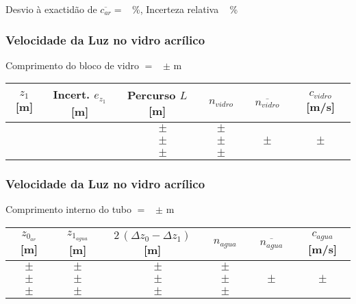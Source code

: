 \documentclass[a4paper,12pt]{article}  %
\begin{document}
\noindent Desvio à exactidão de $\overline{c_{ar}} =$~\underline{\makebox[1cm][r]{~}} \%, 
 Incerteza relativa  ~\underline{\makebox[1cm][r]{~}} \%


\subsubsection{\sf Velocidade da Luz no vidro acrílico}\label{sec:dados_ar}

\noindent Comprimento do bloco de vidro $=$~\underline{\makebox[1cm][r]{~}} $\pm$ \underline{\makebox[1cm][r]{~}} m  

\begin{center}
	\begin{tabular}{|c|c|c|c|c|c|}
	\hline
	 $z_{1}$  [m]   &  Incert. $e_{z_{1}}$  [m] & Percurso $L$ [m] & $n_{vidro}$  & $\overline{n_{vidro}}$ & $c_{vidro}$ [m/s]\\
	\hline \hline
	  &  & $ \quad \pm $ & $ \quad \pm \quad $ &  & \\ \cline{1-4}
	  &  & $ \quad \pm $ & $ \quad \pm \quad$ & $ \quad \pm \quad$  & $ \quad \pm \quad$ \\ \cline{1-4}
	  &  & $ \quad \pm $ & $ \quad \pm \quad $ &  & \\ \hline
			\end{tabular}
\end{center}

\subsubsection{\sf Velocidade da Luz no vidro acrílico}\label{sec:dados_vid}

\noindent Comprimento interno do tubo $=$~\underline{\makebox[1cm][r]{~}} $\pm$ \underline{\makebox[1cm][r]{~}} m  

\begin{center}
	\begin{tabular}{|c|c|c|c|c|c|}
	\hline
	 $z_{0_{ar}}$  [m]   &  $z_{1_{agua}}$  [m] & $2\,(\Delta z_0- \Delta z_1 )$ [m] & $n_{agua}$  & $\overline{n_{agua}}$ & $c_{agua}$ [m/s]\\
	\hline \hline
	 $ \quad \pm \quad $  & $ \quad \pm \quad $  & $ \quad \pm $ & $ \quad \pm \quad $ &  & \\ \cline{1-4}
	  $ \quad \pm \quad $& $ \quad \pm \quad $ & $ \quad \pm $ & $ \quad \pm \quad$ & $ \quad \pm \quad$  & $ \quad \pm \quad$ \\ \cline{1-4}
	  $ \quad \pm \quad $ & $ \quad \pm \quad $ & $ \quad \pm $ & $ \quad \pm \quad $ &  & \\ \hline
			\end{tabular}
\end{center}
\end{document}
